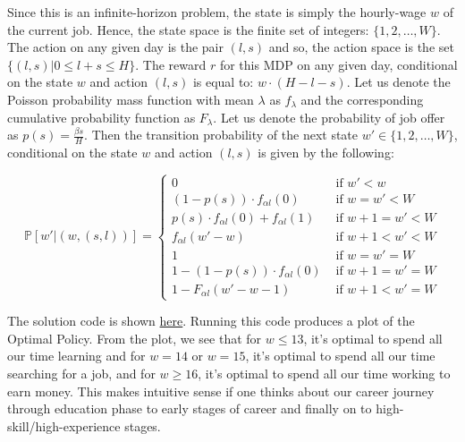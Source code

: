 \documentclass[12pt]{exam}
\begin{document}
\begin{questions}
\begin{solution}


Since this is an infinite-horizon problem, the state is simply the hourly-wage $w$ of the current job. Hence, the state space is the finite set of integers: $\{1, 2, \ldots, W\}$. The action on any given day is the pair $(l, s)$ and so, the action space is the set $\{(l, s) | 0 \leq l + s \leq H\}$. The reward $r$ for this MDP on any given day, conditional on the state $w$ and action $(l,s)$ is equal to: $w\cdot (H - l - s)$. Let us denote the Poisson probability mass function with mean $\lambda$ as $f_{\lambda}$ and the corresponding cumulative probability function as $F_{\lambda}$. Let us denote the probability of job offer as $p(s) = \frac {\beta s } H$. Then the transition probability of the next state $w' \in \{1, 2, \ldots, W\}$, conditional on the state $w$ and action $(l,s)$ is given by the following:

$$
\mathbb{P}[w'|(w, (s,l))] =
\begin{cases}
0 & \text{ if } w' < w\\
(1 - p(s)) \cdot f_{\alpha l}(0) & \text{ if } w = w' < W \\
p(s) \cdot f_{\alpha l}(0) + f_{\alpha l}(1) & \text{ if }  w + 1 = w' < W \\
f_{\alpha l}(w' - w) & \text{ if } w + 1 < w' < W \\
1 & \text{ if } w = w' = W \\
1 - (1 - p(s)) \cdot f_{\alpha l}(0) & \text{ if } w +1 = w' = W \\
1 - F_{\alpha l}(w' - w - 1) & \text{ if } w + 1 < w' = W
\end{cases}
$$

The solution code is shown \href{https://github.com/TikhonJelvis/RL-book/blob/master/rl/problems/Midterm-Winter2021/career_optimization.py}{here}. Running this code produces a plot of the Optimal Policy. From the plot, we see that for $w \leq 13$, it's optimal to spend all our time learning and for $w = 14$ or $w=15$, it's optimal to spend all our time searching for a job, and for $w \geq 16$, it's optimal to spend all our time working to earn money. This makes intuitive sense if one thinks about our career journey through education phase to early stages of career and finally on to high-skill/high-experience stages.


\end{solution}

\end{questions}
\end{document}
